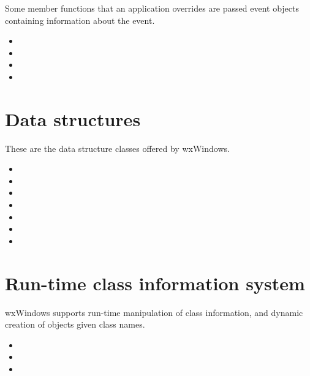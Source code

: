
Some member functions that an application overrides are passed
event objects containing information about the event.

\begin{itemize}\itemsep=0pt
\item {}
\item {}
\item {}
\item {}
\end{itemize}

\section{Data structures}

These are the data structure classes offered by wxWindows.

\begin{itemize}\itemsep=0pt
\item {}
\item {}
\item {}
\item {}
\item {}
\item {}
\item {}
\end{itemize}


\section{Run-time class information system}


wxWindows supports run-time manipulation of class information, and dynamic
creation of objects given class names.

\begin{itemize}\itemsep=0pt
\item {}
\item {}
\item {}
\end{itemize}

